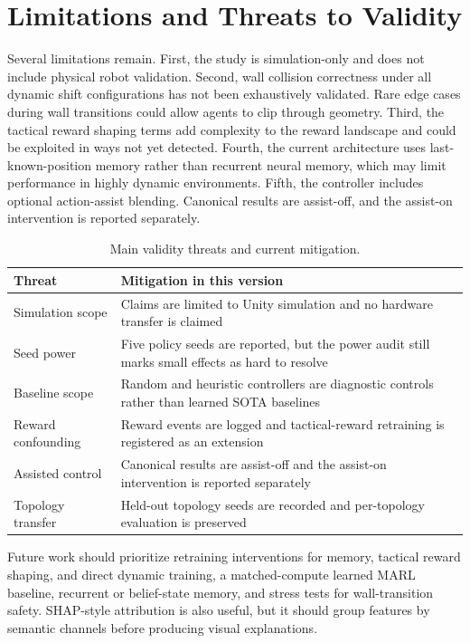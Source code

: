 \documentclass[journal]{IEEEtran}
\begin{document}
\section{Limitations and Threats to Validity}

Several limitations remain. First, the study is simulation-only and does not include physical robot validation. Second, wall collision correctness under all dynamic shift configurations has not been exhaustively validated. Rare edge cases during wall transitions could allow agents to clip through geometry. Third, the tactical reward shaping terms add complexity to the reward landscape and could be exploited in ways not yet detected. Fourth, the current architecture uses last-known-position memory rather than recurrent neural memory, which may limit performance in highly dynamic environments. Fifth, the controller includes optional action-assist blending. Canonical results are assist-off, and the assist-on intervention is reported separately.

\begin{table}[t]
\centering
\caption{Main validity threats and current mitigation.}
\label{tab:validity_threats}
\footnotesize
\begin{tabular}{p{2.3cm}p{5.0cm}}
\toprule
Threat & Mitigation in this version \\
\midrule
Simulation scope & Claims are limited to Unity simulation and no hardware transfer is claimed \\
Seed power & Five policy seeds are reported, but the power audit still marks small effects as hard to resolve \\
Baseline scope & Random and heuristic controllers are diagnostic controls rather than learned SOTA baselines \\
Reward confounding & Reward events are logged and tactical-reward retraining is registered as an extension \\
Assisted control & Canonical results are assist-off and the assist-on intervention is reported separately \\
Topology transfer & Held-out topology seeds are recorded and per-topology evaluation is preserved \\
\bottomrule
\end{tabular}
\end{table}

Future work should prioritize retraining interventions for memory, tactical
reward shaping, and direct dynamic training, a matched-compute learned MARL
baseline, recurrent or belief-state memory, and stress tests for wall-transition
safety. SHAP-style attribution is also useful, but it should group features by
semantic channels before producing visual explanations.
\end{document}
